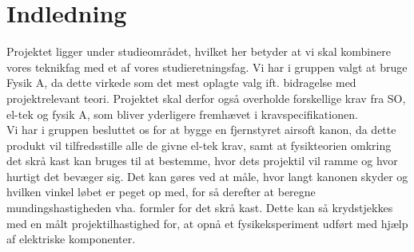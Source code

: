 \section{Indledning}

Projektet ligger under studieområdet, hvilket her betyder at vi skal kombinere vores teknikfag med et af vores studieretningsfag. Vi har i gruppen valgt at bruge Fysik A, da dette virkede som det mest oplagte valg ift. bidragelse med projektrelevant teori. Projektet skal derfor også overholde forskellige krav fra SO, el-tek og fysik A, som bliver yderligere fremhævet i kravspecifikationen.\\

Vi har i gruppen besluttet os for at bygge en fjernstyret airsoft kanon, da dette produkt vil tilfredsstille alle de givne el-tek krav, samt at fysikteorien omkring det skrå kast kan bruges til at bestemme, hvor dets projektil vil ramme og hvor hurtigt det bevæger sig. Det kan gøres ved at måle, hvor langt kanonen skyder og hvilken vinkel løbet er peget op med, for så derefter at beregne mundingshastigheden vha. formler for det skrå kast. Dette kan så krydstjekkes med en målt projektilhastighed for, at opnå et fysikeksperiment udført med hjælp af elektriske komponenter.
